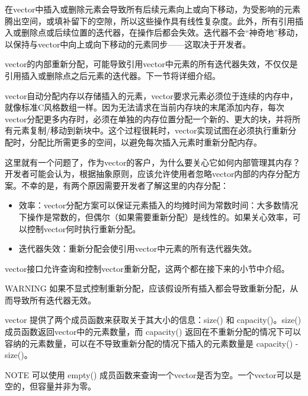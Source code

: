 
在vector中插入或删除元素会导致所有后续元素向上或向下移动，为受影响的元素腾出空间，或填补留下的空隙，所以这些操作具有线性复杂度。此外，所有引用插入或删除点或后续位置的迭代器，在操作后都会失效。迭代器不会“神奇地”移动，以保持与vector中向上或向下移动的元素同步——这取决于开发者。

vector的内部重新分配，可能导致引用vector中元素的所有迭代器失效，不仅仅是引用插入或删除点之后元素的迭代器。下一节将详细介绍。


vector自动分配内存以存储插入的元素，vector要求元素必须位于连续的内存中，就像标准C风格数组一样。因为无法请求在当前内存块的末尾添加内存，每次vector分配更多内存时，必须在单独的内存位置分配一个新的、更大的块，并将所有元素复制/移动到新块中。这个过程很耗时，vector实现试图在必须执行重新分配时，分配比所需更多的空间，以避免每次插入元素时重新分配内存。

这里就有一个问题了，作为vector的客户，为什么要关心它如何内部管理其内存？开发者可能会认为，根据抽象原则，应该允许使用者忽略vector内部的内存分配方案。不幸的是，有两个原因需要开发者了解这里的内存分配：

\begin{itemize}
\item
效率：vector分配方案可以保证元素插入的均摊时间为常数时间：大多数情况下操作是常数的，但偶尔（如果需要重新分配）是线性的。如果关心效率，可以控制vector何时执行重新分配。

\item
迭代器失效：重新分配会使引用vector中元素的所有迭代器失效。
\end{itemize}

vector接口允许查询和控制vector重新分配，这两个都在接下来的小节中介绍。

\begin{myWarning}{WARNING}
如果不显式控制重新分配，应该假设所有插入都会导致重新分配，从而导致所有迭代器无效。
\end{myWarning}


vector 提供了两个成员函数来获取关于其大小的信息：size() 和 capacity()。size() 成员函数返回vector中的元素数量，而 capacity() 返回在不重新分配的情况下可以容纳的元素数量，可以在不导致重新分配的情况下插入的元素数量是 capacity() - size()。

\begin{myNotic}{NOTE}
可以使用 empty() 成员函数来查询一个vector是否为空。一个vector可以是空的，但容量并非为零。
\end{myNotic}


